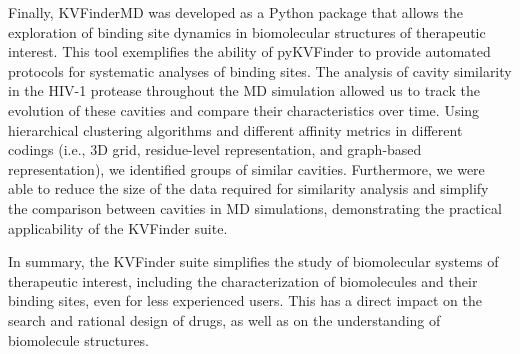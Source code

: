 \documentclass[Ingles]{phdthesis}
\def\ie{i.e.\onedot}
\begin{document}
Finally, KVFinderMD was developed as a Python package that allows the exploration of binding site dynamics in biomolecular structures of therapeutic interest. This tool exemplifies the ability of pyKVFinder to provide automated protocols for systematic analyses of binding sites. The analysis of cavity similarity in the \acs{HIV-1} protease throughout the \acs{MD} simulation allowed us to track the evolution of these cavities and compare their characteristics over time. Using hierarchical clustering algorithms and different affinity metrics in different codings (\ie, \acs{3D} grid, residue-level representation, and graph-based representation), we identified groups of similar cavities. Furthermore, we were able to reduce the size of the data required for similarity analysis and simplify the comparison between cavities in \acs{MD} simulations, demonstrating the practical applicability of the KVFinder suite.

In summary, the KVFinder suite simplifies the study of biomolecular systems of therapeutic interest, including the characterization of biomolecules and their binding sites, even for less experienced users. This has a direct impact on the search and rational design of drugs, as well as on the understanding of biomolecule structures.




\appendix
\end{document}
